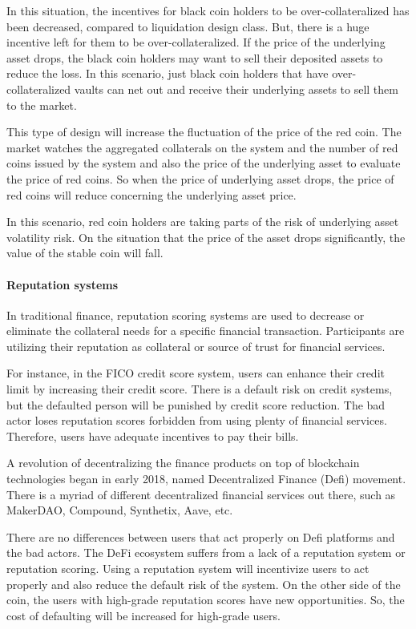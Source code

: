 In this situation, the incentives for black coin holders to be over-collateralized has been decreased, compared to liquidation design class. But, there is a huge incentive left for them to be over-collateralized. If the price of the underlying asset drops, the black coin holders may want to sell their deposited assets to reduce the loss. In this scenario, just black coin holders that have over-collateralized vaults can net out and receive their underlying assets to sell them to the market.

This type of design will increase the fluctuation of the price of the red coin. The market watches the aggregated collaterals on the system and the number of red coins issued by the system and also the price of the underlying asset to evaluate the price of red coins. So when the price of underlying asset drops, the price of red coins will reduce concerning the underlying asset price. 

In this scenario, red coin holders are taking parts of the risk of underlying asset volatility risk. On the situation that the price of the asset drops significantly, the value of the stable coin will fall.

\paragraph{Reputation systems}

In traditional finance, reputation scoring systems are used to decrease or eliminate the collateral needs for a specific financial transaction. Participants are utilizing their reputation as collateral or source of trust for financial services. 

For instance, in the FICO credit score system, users can enhance their credit limit by increasing their credit score. There is a default risk on credit systems, but the defaulted person will be punished by credit score reduction. The bad actor loses reputation scores forbidden from using plenty of financial services. Therefore, users have adequate incentives to pay their bills.

A revolution of decentralizing the finance products on top of blockchain technologies began in early 2018, named Decentralized Finance (Defi) movement. There is a myriad of different decentralized financial services out there, such as MakerDAO, Compound, Synthetix, Aave, etc. 

There are no differences between users that act properly on Defi platforms and the bad actors. The DeFi ecosystem suffers from a lack of a reputation system or reputation scoring. Using a reputation system will incentivize users to act properly and also reduce the default risk of the system. On the other side of the coin, the users with high-grade reputation scores have new opportunities. So, the cost of defaulting will be increased for high-grade users.

